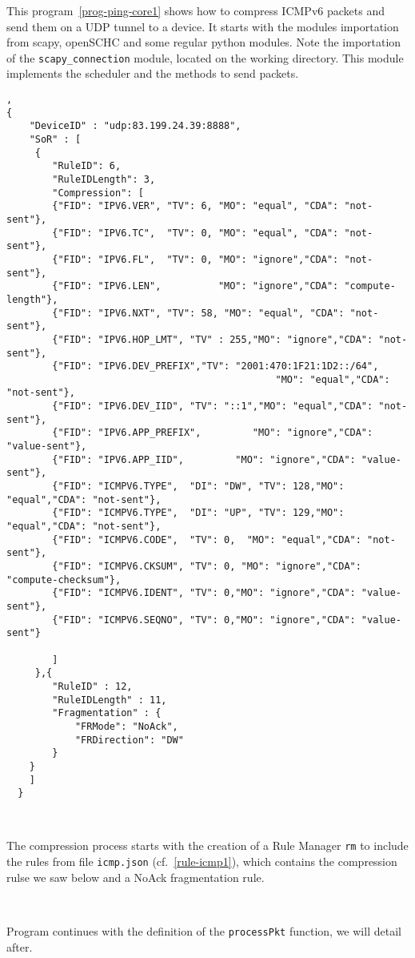 \documentclass[onecolumn,12pt]{book}
\newcounter{c}
\begin{document}
This program~\vref{prog-ping-core1} shows how to compress ICMPv6 packets and send them on a UDP tunnel to a device. It starts with the modules importation from scapy, openSCHC and some regular python modules. Note the importation of the \texttt{scapy\_connection} module, located on the working directory. This module implements the scheduler and the methods to send packets.

\begin{lstlisting}[caption={rule icmp1.json}, backgroundcolor=\color{yellow}, label=rule-icmp1, basicstyle=\ttfamily\tiny],
{
    "DeviceID" : "udp:83.199.24.39:8888",
    "SoR" : [
	 {
	    "RuleID": 6,
	    "RuleIDLength": 3,
	    "Compression": [
		{"FID": "IPV6.VER", "TV": 6, "MO": "equal", "CDA": "not-sent"},
		{"FID": "IPV6.TC",  "TV": 0, "MO": "equal", "CDA": "not-sent"},
		{"FID": "IPV6.FL",  "TV": 0, "MO": "ignore","CDA": "not-sent"},
		{"FID": "IPV6.LEN",          "MO": "ignore","CDA": "compute-length"},
		{"FID": "IPV6.NXT", "TV": 58, "MO": "equal", "CDA": "not-sent"},
		{"FID": "IPV6.HOP_LMT", "TV" : 255,"MO": "ignore","CDA": "not-sent"},
		{"FID": "IPV6.DEV_PREFIX","TV": "2001:470:1F21:1D2::/64",
                                               "MO": "equal","CDA": "not-sent"},
		{"FID": "IPV6.DEV_IID", "TV": "::1","MO": "equal","CDA": "not-sent"},
		{"FID": "IPV6.APP_PREFIX",         "MO": "ignore","CDA": "value-sent"},
		{"FID": "IPV6.APP_IID",         "MO": "ignore","CDA": "value-sent"},
		{"FID": "ICMPV6.TYPE",  "DI": "DW", "TV": 128,"MO": "equal","CDA": "not-sent"},
		{"FID": "ICMPV6.TYPE",  "DI": "UP", "TV": 129,"MO": "equal","CDA": "not-sent"},
		{"FID": "ICMPV6.CODE",  "TV": 0,  "MO": "equal","CDA": "not-sent"},
		{"FID": "ICMPV6.CKSUM", "TV": 0, "MO": "ignore","CDA": "compute-checksum"},
		{"FID": "ICMPV6.IDENT", "TV": 0,"MO": "ignore","CDA": "value-sent"},
		{"FID": "ICMPV6.SEQNO", "TV": 0,"MO": "ignore","CDA": "value-sent"}
		
	    ]
	 },{
		"RuleID" : 12,
		"RuleIDLength" : 11,
		"Fragmentation" : {
			"FRMode": "NoAck",
			"FRDirection": "DW"
		}
	} 
    ]
  }
\end{lstlisting}

~~

The compression process starts with the creation of a Rule Manager \texttt{rm} to include the rules from file \texttt{icmp.json} (cf.~\vref{rule-icmp1}), which contains  the compression rulse we saw below and a NoAck fragmentation rule.

~~

Program continues with the definition of the \texttt{processPkt} function, we will detail after.
\end{document}
